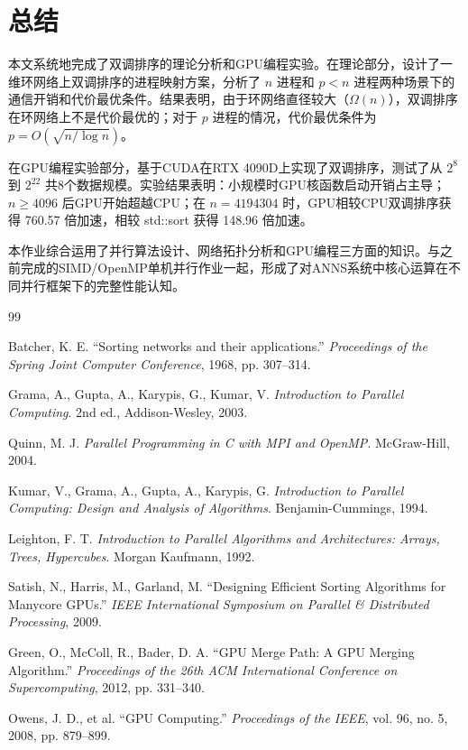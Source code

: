 \documentclass[UTF8,a4paper,10pt]{ctexart}
\begin{document}
\section{总结}

本文系统地完成了双调排序的理论分析和GPU编程实验。在理论部分，设计了一维环网络上双调排序的进程映射方案，分析了 $n$ 进程和 $p < n$ 进程两种场景下的通信开销和代价最优条件。结果表明，由于环网络直径较大（$\Omega(n)$），双调排序在环网络上不是代价最优的；对于 $p$ 进程的情况，代价最优条件为 $p = O(\sqrt{n / \log n})$。

在GPU编程实验部分，基于CUDA在RTX 4090D上实现了双调排序，测试了从 $2^8$ 到 $2^{22}$ 共8个数据规模。实验结果表明：小规模时GPU核函数启动开销占主导；$n \geq 4096$ 后GPU开始超越CPU；在 $n = 4194304$ 时，GPU相较CPU双调排序获得 760.57 倍加速，相较 std::sort 获得 148.96 倍加速。

本作业综合运用了并行算法设计、网络拓扑分析和GPU编程三方面的知识。与之前完成的SIMD/OpenMP单机并行作业一起，形成了对ANNS系统中核心运算在不同并行框架下的完整性能认知。


\newpage
\begin{thebibliography}{99}

 Batcher, K. E. ``Sorting networks and their applications.'' \textit{Proceedings of the Spring Joint Computer Conference}, 1968, pp. 307--314.

 Grama, A., Gupta, A., Karypis, G., Kumar, V. \textit{Introduction to Parallel Computing}. 2nd ed., Addison-Wesley, 2003.

 Quinn, M. J. \textit{Parallel Programming in C with MPI and OpenMP}. McGraw-Hill, 2004.

 Kumar, V., Grama, A., Gupta, A., Karypis, G. \textit{Introduction to Parallel Computing: Design and Analysis of Algorithms}. Benjamin-Cummings, 1994.

 Leighton, F. T. \textit{Introduction to Parallel Algorithms and Architectures: Arrays, Trees, Hypercubes}. Morgan Kaufmann, 1992.

 Satish, N., Harris, M., Garland, M. ``Designing Efficient Sorting Algorithms for Manycore GPUs.'' \textit{IEEE International Symposium on Parallel \& Distributed Processing}, 2009.

 Green, O., McColl, R., Bader, D. A. ``GPU Merge Path: A GPU Merging Algorithm.'' \textit{Proceedings of the 26th ACM International Conference on Supercomputing}, 2012, pp. 331--340.

 Owens, J. D., et al. ``GPU Computing.'' \textit{Proceedings of the IEEE}, vol. 96, no. 5, 2008, pp. 879--899.

\end{thebibliography}
\end{document}

